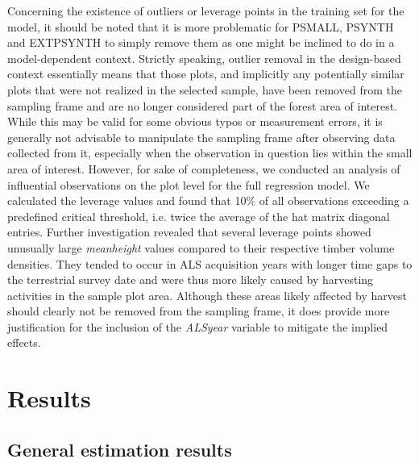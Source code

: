 \documentclass[remotesensing,article,submit,moreauthors,pdftex,10pt,a4paper]{mdpi}
\newcommand{\psynth}{PSYNTH}
\newcommand{\psmall}{PSMALL}
\newcommand{\extpsynth}{EXTPSYNTH}
\newcommand{\meanheight}{\textit{meanheight}}
\newcommand{\alsyear}{\textit{ALSyear}}
\begin{document}




Concerning the existence of outliers or leverage points in the training set for the model, it should be noted that it is more problematic for \psmall{}, \psynth{} and \extpsynth{} to simply remove them as one might be inclined to do in a model-dependent context. Strictly speaking, outlier removal in the design-based context essentially means that those plots, and implicitly any potentially similar plots that were not realized in the selected sample, have been removed from the sampling frame and are no longer considered part of the forest area of interest. While this may be valid for some obvious typos or measurement errors, it is generally not advisable to manipulate the sampling frame after observing data collected from it, especially when the observation in question lies within the small area of interest. However, for sake of completeness, we conducted an analysis of influential observations \citep[pp. 160--167]{fahrmeir2013} on the plot level for the full regression model. We calculated the leverage values and found that 10\% of all observations exceeding a predefined critical threshold, i.e. twice the average of the hat matrix diagonal entries. Further investigation revealed that several leverage points showed unusually large \meanheight{} values compared to their respective timber volume densities. They tended to occur in ALS acquisition years with longer time gaps to the terrestrial survey date and were thus more likely caused by harvesting activities in the sample plot area.  Although these areas likely affected by harvest should clearly not be removed from the sampling frame, it does provide more justification for the inclusion of the \alsyear{} variable to mitigate the implied effects.



\section{Results}
\label{sec:Res}


\subsection{General estimation results}
\label{sec:feasest}
\end{document}
